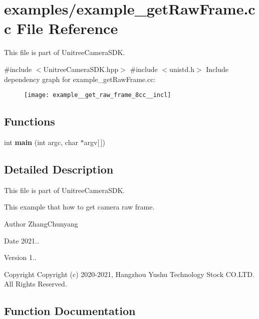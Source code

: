 \section{examples/example\+\_\+get\+Raw\+Frame.cc File Reference}
\label{example__get_raw_frame_8cc}


This file is part of Unitree\+Camera\+S\+DK.  


{\ttfamily \#include $<$Unitree\+Camera\+S\+D\+K.\+hpp$>$}\newline
{\ttfamily \#include $<$unistd.\+h$>$}\newline
Include dependency graph for example\+\_\+get\+Raw\+Frame.\+cc\+:\nopagebreak
\begin{figure}[H]
\begin{center}
\leavevmode
\texttt{[image: example\_\_get\_raw\_frame\_8cc\_\_incl]}
\end{center}
\end{figure}
\subsection*{Functions}
\begin{DoxyCompactItemize}
\item 
int \textbf{ main} (int argc, char $\ast$argv[$\,$])
\end{DoxyCompactItemize}


\subsection{Detailed Description}
This file is part of Unitree\+Camera\+S\+DK. 

This example that how to get camera raw frame. \begin{DoxyAuthor}{Author}
Zhang\+Chunyang 
\end{DoxyAuthor}
\begin{DoxyDate}{Date}
2021.. 
\end{DoxyDate}
\begin{DoxyVersion}{Version}
1.. 
\end{DoxyVersion}
\begin{DoxyCopyright}{Copyright}
Copyright (c) 2020-\/2021, Hangzhou Yushu Technology Stock C\+O.\+L\+TD. All Rights Reserved. 
\end{DoxyCopyright}


\subsection{Function Documentation}
\mbox{\label{example__get_raw_frame_8cc_a0ddf1224851353fc92bfbff6f499fa97}} 
